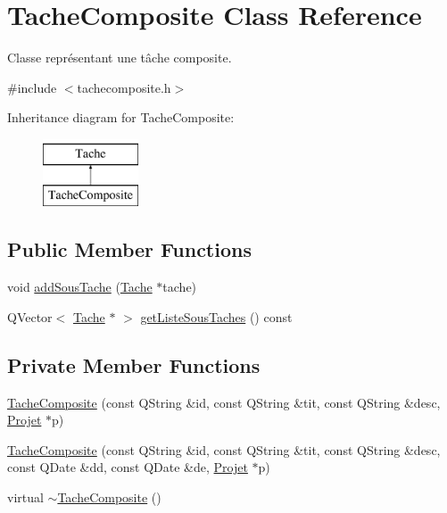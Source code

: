 \hypertarget{class_tache_composite}{}\section{Tache\+Composite Class Reference}
\label{class_tache_composite}


Classe représentant une tâche composite.  




{\ttfamily \#include $<$tachecomposite.\+h$>$}

Inheritance diagram for Tache\+Composite\+:\begin{figure}[H]
\begin{center}
\leavevmode
\includegraphics[height=2.000000cm]{class_tache_composite}
\end{center}
\end{figure}
\subsection*{Public Member Functions}
\begin{DoxyCompactItemize}
\item 
void \hyperlink{class_tache_composite_ab4243a926687c17556eeaa34ecbe1567}{add\+Sous\+Tache} (\hyperlink{class_tache}{Tache} $\ast$tache)
\item 
Q\+Vector$<$ \hyperlink{class_tache}{Tache} $\ast$ $>$ \hyperlink{class_tache_composite_a4c7408084fe783835b083501757a1c19}{get\+Liste\+Sous\+Taches} () const 
\end{DoxyCompactItemize}
\subsection*{Private Member Functions}
\begin{DoxyCompactItemize}
\item 
\hyperlink{class_tache_composite_a3042d6bf7df70fe0e56f314224fbae53}{Tache\+Composite} (const Q\+String \&id, const Q\+String \&tit, const Q\+String \&desc, \hyperlink{class_projet}{Projet} $\ast$p)
\item 
\hyperlink{class_tache_composite_a073e2621c0bc6cf8e61e2ef6f5e938eb}{Tache\+Composite} (const Q\+String \&id, const Q\+String \&tit, const Q\+String \&desc, const Q\+Date \&dd, const Q\+Date \&de, \hyperlink{class_projet}{Projet} $\ast$p)
\item 
virtual \hyperlink{class_tache_composite_a70ddee42aa910b22a06e8197f5873698}{$\sim$\+Tache\+Composite} ()
\end{DoxyCompactItemize}

